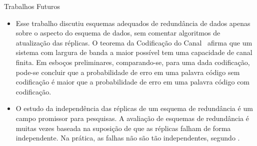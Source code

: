 \begin{frame}{Trabalhos Futuros}

   \begin{itemize}

      \item<1-> Esse trabalho discutiu esquemas adequados de redundância de dados apenas sobre o aspecto do esquema de dados, sem comentar algoritmos de atualização das réplicas. O teorema da Codificação do Canal~\cite{Abrantes:2010,Schwartz:1990} afirma que um sistema com largura de banda a maior possível tem uma capacidade de canal finita. Em esboços preliminares, comparando-se, para uma dada codificação, pode-se concluir que a probabilidade de erro em uma palavra código sem codificação é maior que a probabilidade de erro em uma palavra código com codificação.

       \item<2-> O estudo da independência das réplicas de um esquema de redundância é um campo promissor para pesquisas. A avaliação de esquemas de redundância é muitas vezes baseada na suposição de que as réplicas falham de forma independente. Na prática, as falhas não são tão independentes, segundo \cite{Weatherspoon:2002:02,Baker:2006}.


  \end{itemize}

\end{frame}

